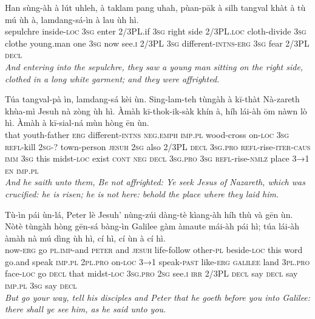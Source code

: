 \documentclass[11pt,a4paper]{article}
\begin{document}
\begin{exe}
\gll Han sùng-àh à lút uhleh, à taklam pang uhah, pùan-pāk à silh tangval khàt à tù mú ùh à, lamdang-sá-ìn à lau ùh hì. \\
     sepulchre inside-\textsc{loc} \textsc{3sg} enter 2/3PL.if \textsc{3sg} right side 2/3PL.\textsc{loc} cloth-divide \textsc{3sg} clothe young.man one \textsc{3sg} now see.\textsc{i} 2/3PL \textsc{3sg} different-\textsc{intns}-\textsc{erg} \textsc{3sg} fear 2/3PL \textsc{decl} \\
\glt \textcolor{kjvcolor}{\textit{And entering into the sepulchre, they saw a young man sitting on the right side, clothed in a long white garment; and they were affrighted.}}

\gll Túa tangval-pà ìn, lamdang-sá kèi ùn. Sing-lam-teh tùngàh à kī-thàt Nà-zareth khùa-mì Jesuh nà zòng ùh hì. Àmàh kī-thok-ik-sàk khín à, híh lái-àh ōm nàwn lò hì. Àmàh à kī-sial-ná mùn hòng ēn ùn. \\
     that youth-father \textsc{erg} different-\textsc{intns} \textsc{neg}.\textsc{emph} \textsc{imp}.\textsc{pl} wood-cross on-\textsc{loc} \textsc{3sg} \textsc{refl}-kill \textsc{2sg}-? town-person \textsc{jesuh} \textsc{2sg} also 2/3PL \textsc{decl} \textsc{3sg}.\textsc{pro} \textsc{refl}-rise-\textsc{iter}-\textsc{caus} \textsc{imm} \textsc{3sg} this midst-\textsc{loc} exist \textsc{cont} \textsc{neg} \textsc{decl} \textsc{3sg}.\textsc{pro} \textsc{3sg} \textsc{refl}-rise-\textsc{nmlz} place \textsc{3→1} \textsc{en} \textsc{imp}.\textsc{pl} \\
\glt \textcolor{kjvcolor}{\textit{And he saith unto them, Be not affrighted: Ye seek Jesus of Nazareth, which was crucified: he is risen; he is not here: behold the place where they laid him.}}

\gll Tù-ìn pái ùn-lá, Peter lè Jesuh' nùng-zúi dàng-tè kìang-àh híh thù và gēn ùn. Nòtè tùngàh hòng gēn-sá bàng-ìn Galilee gàm àmaute mái-àh pái hì; túa lái-àh àmàh nà mú dìng ùh hì, cí hì, cí ùn à cí hì. \\
     now-\textsc{erg} go \textsc{pl}.\textsc{imp}-and \textsc{peter} and \textsc{jesuh} life-follow other-\textsc{pl} beside-\textsc{loc} this word go.and speak \textsc{imp}.\textsc{pl} \textsc{2pl}.\textsc{pro} on-\textsc{loc} \textsc{3→1} speak-\textsc{past} like-\textsc{erg} \textsc{galilee} land \textsc{3pl}.\textsc{pro} face-\textsc{loc} go \textsc{decl} that midst-\textsc{loc} \textsc{3sg}.\textsc{pro} \textsc{2sg} see.\textsc{i} \textsc{irr} 2/3PL \textsc{decl} say \textsc{decl} say \textsc{imp}.\textsc{pl} \textsc{3sg} say \textsc{decl} \\
\glt \textcolor{kjvcolor}{\textit{But go your way, tell his disciples and Peter that he goeth before you into Galilee: there shall ye see him, as he said unto you.}}


\end{exe}
\end{document}
